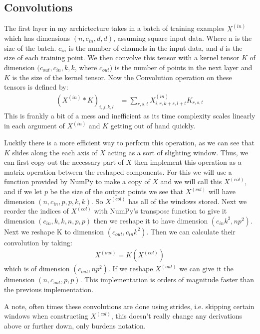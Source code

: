 \documentclass[12pt]{article}
\begin{document}
\subsection*{Convolutions}
The first layer in my archictecture takes in a batch of training examples
$X^{(in)}$ which has dimensions $(n, c_{in}, d, d)$, assuming square input data. Where n is the size of the batch. 
$c_{in}$ is the number of channels in the input data, and $d$ is the size of each training point. We then
convolve this tensor with a kernel tensor $K$ of dimension $(c_{out}, c_{in}, k, k$, where $c_{out})$ is the number
of points in the next layer and $K$ is the size of the kernel tensor. Now the Convolution operation on these tensors
is defined by:
\begin{align*}
    (X^{(in)} * K)_{i,j,k,l} &= \sum_{r,s,t}X^{(in)}_{i,r,k + s, l + t}K_{r,s,t}
\end{align*}
This is frankly a bit of a mess and inefficient as its time complexity scales linearly in each
argument of $X^{(in)}$ and $K$ getting out of hand quickly.


Luckily there is a more efficient way to perform this operation, as we can see that $K$ slides
along the each axis of $X$ acting as a sort of slighting window. Thus, we can
first copy out the necessary part of $X$ then implement this operation as a matrix operation
between the reshaped components. For this we will use a function provided
by NumPy to make a copy of $X$ and we will call this $X^{(col)}$, and if we let
$p$ be the size of the output points we see that $X^{(col)}$ will have dimension
$(n, c_{in}, p, p, k, k)$. So $X^{(col)}$ has all of the windows stored. Next we
reorder the indices of $X^{(col)}$ with NumPy's transpose function to give it
dimension $(c_{in}, k, k, n, p, p)$ then we reshape it to have dimension $(c_{in}k^2, np^2)$.
Next we reshape K to dimension $(c_{out}, c_{in}k^2)$. Then we can calculate
their convolution by taking:
\begin{align*}
    X^{(out)} = K(X^{(col)})
\end{align*}
which is of dimension $(c_{out}, np^2)$. If we reshape $X^{(out)}$ we can give it the dimension $(n, c_{out}, p, p)$.
This implementation is orders of magnitude faster than the previous implementation.


A note, often times these convolutions are done using strides, i.e. skipping certain windows when constructing
$X^{(col)}$, this doesn't really change any derivations above or further down, only burdens notation.
\end{document}
